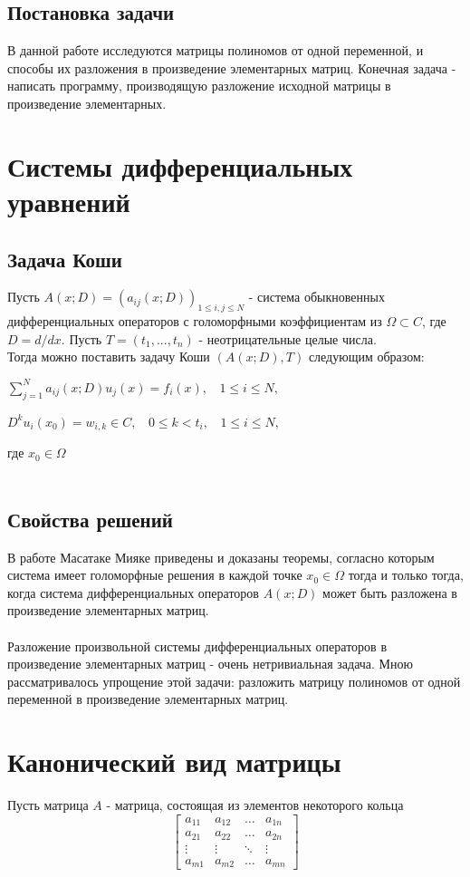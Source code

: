 \documentclass[12pt]{extreport}
\begin{document}
		\section{Постановка задачи}
		В данной работе исследуются матрицы полиномов от одной переменной, 
		и способы их разложения в произведение элементарных матриц.
		Конечная задача - написать программу, производящую разложение
		исходной матрицы в произведение элементарных.
	\newpage
	\chapter{Системы дифференциальных уравнений}
		\section{Задача Коши}
		Пусть $A(x;D) = (a_{ij}(x;D))_{1 \leq i, j \leq N}$ - система обыкновенных 		
		дифференциальных операторов с голоморфными коэффициентам из $\Omega \subset C$,
		где $D = d/dx$. Пусть $T = (t_1,...,t_n)$ - неотрицательные целые числа. \\
		Тогда можно поставить задачу Коши $(A(x;D), T)$ следующим образом: 
		\begin{center}
			$\sum\limits_{j=1}^N a_{ij}(x;D)u_j(x) = f_i(x), \ \ \ \ 1 \leq i \leq N,$
		\end{center}
		\begin{center}
			$D^ku_i(x_0) = w_{i, k} \in C,\ \ \ \ 0 \leq k < t_i, \ \ \ \ 1 \leq i \leq N, $
		\end{center}
		где $x_0 \in \Omega$\\\\
		\section{Свойства решений}
		В работе \cite{miyake} Масатаке Мияке приведены и доказаны теоремы, согласно которым система
		имеет голоморфные решения в каждой точке $x_0 \in \Omega$ тогда и только тогда,
		когда система дифференциальных операторов $A(x;D)$ может быть разложена 
		в произведение элементарных матриц. \\\\
		Разложение произвольной системы дифференциальных операторов в произведение
		элементарных матриц - очень нетривиальная задача. Мною рассматривалось упрощение
		этой задачи: разложить матрицу полиномов от одной переменной в произведение
		элементарных матриц.
	\newpage
	\chapter{Канонический вид матрицы}
		Пусть матрица $A$ - матрица, состоящая из элементов некоторого кольца
		\[ 
		\begin{bmatrix}
			a_{11} & a_{12} & \dots & a_{1n} \\
			a_{21} & a_{22} & \dots & a_{2n} \\
			\vdots & \vdots & \ddots & \vdots \\
			a_{m1} & a_{m2} & \dots & a_{mn}
		\end{bmatrix} 
		\]
\end{document}
